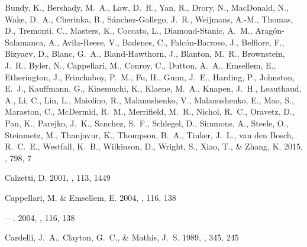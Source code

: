\begin{thebibliography}
{Bundy}, K., {Bershady}, M.~A., {Law}, D.~R., {Yan}, R., {Drory}, N.,
  {MacDonald}, N., {Wake}, D.~A., {Cherinka}, B., {S{\'a}nchez-Gallego}, J.~R.,
  {Weijmans}, A.-M., {Thomas}, D., {Tremonti}, C., {Masters}, K., {Coccato},
  L., {Diamond-Stanic}, A.~M., {Arag{\'o}n-Salamanca}, A., {Avila-Reese}, V.,
  {Badenes}, C., {Falc{\'o}n-Barroso}, J., {Belfiore}, F., {Bizyaev}, D.,
  {Blanc}, G.~A., {Bland-Hawthorn}, J., {Blanton}, M.~R., {Brownstein}, J.~R.,
  {Byler}, N., {Cappellari}, M., {Conroy}, C., {Dutton}, A.~A., {Emsellem}, E.,
  {Etherington}, J., {Frinchaboy}, P.~M., {Fu}, H., {Gunn}, J.~E., {Harding},
  P., {Johnston}, E.~J., {Kauffmann}, G., {Kinemuchi}, K., {Klaene}, M.~A.,
  {Knapen}, J.~H., {Leauthaud}, A., {Li}, C., {Lin}, L., {Maiolino}, R.,
  {Malanushenko}, V., {Malanushenko}, E., {Mao}, S., {Maraston}, C.,
  {McDermid}, R.~M., {Merrifield}, M.~R., {Nichol}, R.~C., {Oravetz}, D.,
  {Pan}, K., {Parejko}, J.~K., {Sanchez}, S.~F., {Schlegel}, D., {Simmons}, A.,
  {Steele}, O., {Steinmetz}, M., {Thanjavur}, K., {Thompson}, B.~A., {Tinker},
  J.~L., {van den Bosch}, R.~C.~E., {Westfall}, K.~B., {Wilkinson}, D.,
  {Wright}, S., {Xiao}, T., \& {Zhang}, K. 2015, \apj, 798, 7


{Calzetti}, D. 2001, \pasp, 113, 1449


{Cappellari}, M. \& {Emsellem}, E. 2004{}, \pasp, 116, 138


---. 2004{}, \pasp, 116, 138


{Cardelli}, J.~A., {Clayton}, G.~C., \& {Mathis}, J.~S. 1989, \apj, 345, 245



\end{thebibliography}

